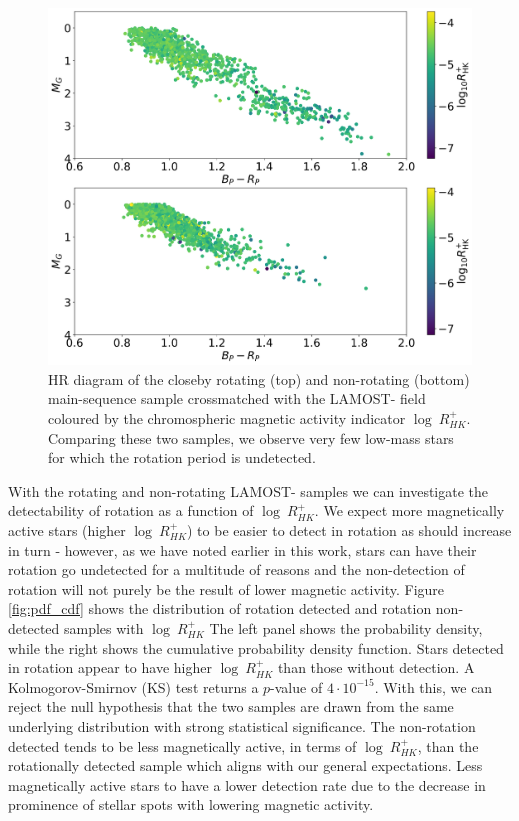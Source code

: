 \begin{figure}
\centering
  \includegraphics[width=\textwidth]{Figures/rot_gap_figures/HR_mag_and_non_rot.png}
  \caption{
  HR diagram of the closeby rotating (top) and non-rotating (bottom) main-sequence sample crossmatched with the LAMOST-\kepler{} field coloured by the chromospheric magnetic activity indicator $\log \ R^{+}_{HK}$.
  Comparing these two samples, we observe very few low-mass stars for which the rotation period is undetected.}
  \label{fig:non_rotating_mag_hr}
\end{figure}

With the rotating and non-rotating LAMOST-\kepler{} samples we can investigate the detectability of rotation as a function of $\log \ R^{+}_{HK}$.
We expect more magnetically active stars (higher $\log \ R^{+}_{HK}$) to be easier to detect in rotation as \rper{} should increase in turn - however, as we have noted earlier in this work, stars can have their rotation go undetected for a multitude of reasons and the non-detection of rotation will not purely be the result of lower magnetic activity.
Figure \ref{fig:pdf_cdf} shows the distribution of rotation detected and rotation non-detected samples with $\log \ R^{+}_{HK}$
The left panel shows the probability density, while the right shows the cumulative probability density function.
Stars detected in rotation appear to have higher $\log \ R^{+}_{HK}$ than those without detection.
A Kolmogorov-Smirnov (KS) test returns a $p$-value of $4 \cdot10^{-15}$.
With this, we can reject the null hypothesis that the two samples are drawn from the same underlying distribution with strong statistical significance.
The non-rotation detected tends to be less magnetically active, in terms of $\log \ R^{+}_{HK}$, than the rotationally detected sample which aligns with our general expectations.
Less magnetically active stars to have a lower detection rate due to the decrease in prominence of stellar spots with lowering magnetic activity.

